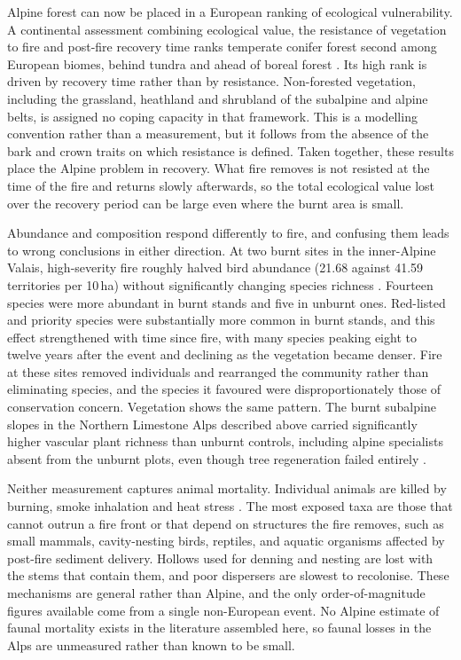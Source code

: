 \documentclass[11pt,a4paper]{article}
\begin{document}
Alpine forest can now be placed in a European ranking of ecological vulnerability. A continental assessment combining ecological value, the resistance of vegetation to fire and post-fire recovery time ranks temperate conifer forest second among European biomes, behind tundra and ahead of boreal forest \citep{arrogantefunes_mapping_2024}. Its high rank is driven by recovery time rather than by resistance. Non-forested vegetation, including the grassland, heathland and shrubland of the subalpine and alpine belts, is assigned no coping capacity in that framework. This is a modelling convention rather than a measurement, but it follows from the absence of the bark and crown traits on which resistance is defined. Taken together, these results place the Alpine problem in recovery. What fire removes is not resisted at the time of the fire and returns slowly afterwards, so the total ecological value lost over the recovery period can be large even where the burnt area is small.

Abundance and composition respond differently to fire, and confusing them leads to wrong conclusions in either direction. At two burnt sites in the inner-Alpine Valais, high-severity fire roughly halved bird abundance (21.68 against 41.59 territories per 10\,ha) without significantly changing species richness \citep{rey_effects_2019}. Fourteen species were more abundant in burnt stands and five in unburnt ones. Red-listed and priority species were substantially more common in burnt stands, and this effect strengthened with time since fire, with many species peaking eight to twelve years after the event and declining as the vegetation became denser. Fire at these sites removed individuals and rearranged the community rather than eliminating species, and the species it favoured were disproportionately those of conservation concern. Vegetation shows the same pattern. The burnt subalpine slopes in the Northern Limestone Alps described above carried significantly higher vascular plant richness than unburnt controls, including alpine specialists absent from the unburnt plots, even though tree regeneration failed entirely \citep{degiuli_arrested_2024}.

Neither measurement captures animal mortality. Individual animals are killed by burning, smoke inhalation and heat stress \citep{demiguel_fires_2021}. The most exposed taxa are those that cannot outrun a fire front or that depend on structures the fire removes, such as small mammals, cavity-nesting birds, reptiles, and aquatic organisms affected by post-fire sediment delivery. Hollows used for denning and nesting are lost with the stems that contain them, and poor dispersers are slowest to recolonise. These mechanisms are general rather than Alpine, and the only order-of-magnitude figures available come from a single non-European event. No Alpine estimate of faunal mortality exists in the literature assembled here, so faunal losses in the Alps are unmeasured rather than known to be small.
\end{document}
